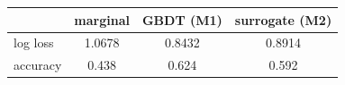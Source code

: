 \begin{tabular}{lccc}
\toprule
 & marginal & GBDT (M1) & surrogate (M2) \\
\midrule
log loss & 1.0678 & 0.8432 & 0.8914 \\
accuracy & 0.438 & 0.624 & 0.592 \\
\bottomrule
\end{tabular}
